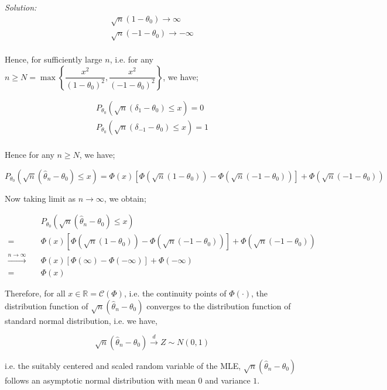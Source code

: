\documentclass[12pt]{article}
\newcommand{\R}{\mathbb{R}}
\theoremstyle{definition}
\newenvironment{answer}{\textit{Solution: }\quad }{ \hfill \qedsymbol}
\begin{document}
\begin{answer}
	$$
	\begin{array}{l}
		\sqrt{n}(1 - \theta_0) \rightarrow \infty\\
		\sqrt{n}(-1 - \theta_0) \rightarrow -\infty\\
	\end{array}
	$$

	Hence, for sufficiently large $n$, i.e. for any $n \geq N =  \max\left\{ \dfrac{x^2}{(1-\theta_0)^2}, \dfrac{x^2}{(-1-\theta_0)^2} \right\}$, we have;

	$$
	\begin{array}{l}
		P_{\theta_0}(\sqrt{n}(\delta_1 - \theta_0) \leq x) = 0\\
		P_{\theta_0}(\sqrt{n}(\delta_{-1} - \theta_0) \leq x) = 1\\
	\end{array}
	$$

	Hence for any $n \geq N$, we have;

	$$
	P_{\theta_0} \left( \sqrt{n}(\widehat{\theta}_n - \theta_0) \leq x \right) = \Phi(x) \left[ \Phi\left( \sqrt{n}(1-\theta_0) \right) - \Phi\left( \sqrt{n}(-1-\theta_0) \right) \right] + \Phi\left( \sqrt{n}(-1-\theta_0) \right)
	$$

	Now taking limit as $n \rightarrow \infty$, we obtain;

	\begin{align*}
		& P_{\theta_0} \left( \sqrt{n}(\widehat{\theta}_n - \theta_0) \leq x \right)\\
		= \quad & \Phi(x) \left[ \Phi\left( \sqrt{n}(1-\theta_0) \right) - \Phi\left( \sqrt{n}(-1-\theta_0) \right) \right] + \Phi\left( \sqrt{n}(-1-\theta_0) \right)\\
		\xrightarrow{n \rightarrow \infty} \quad & \Phi(x) \left[ \Phi\left( \infty \right) - \Phi\left( -\infty \right) \right] + \Phi\left( -\infty \right)\\
		= \quad & \Phi(x)
	\end{align*}

	Therefore, for all $x \in \R = \mathcal{C}(\Phi)$, i.e. the continuity points of $\Phi(\cdot)$, the distribution function of $\sqrt{n}(\widehat{\theta}_n - \theta_0)$ converges to the distribution function of standard normal distribution, i.e. we have,

	$$\sqrt{n}(\widehat{\theta}_n - \theta_0) \xrightarrow{d} Z \sim N(0, 1)$$

	i.e. the suitably centered and scaled random variable of the MLE, $\sqrt{n}(\widehat{\theta}_n - \theta_0)$ follows an asymptotic normal distribution with mean $0$ and variance $1$.
\end{answer}
\end{document}
